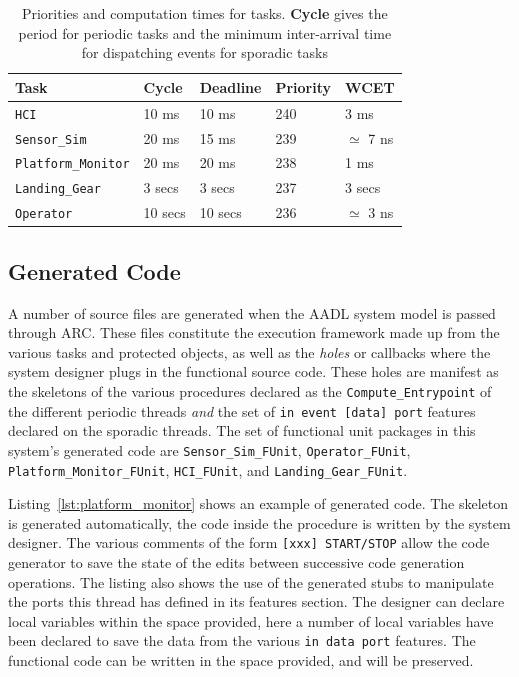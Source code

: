\begin{table}
\centering
\begin{tabular}{|l|l|l|l|l|}
\hline
\textbf{Task} & \textbf{Cycle} & \textbf{Deadline} &
\textbf{Priority} & \textbf{WCET}\\
\hline
\texttt{HCI} & 10 ms & 10 ms & 240 & 3 ms\\
\texttt{Sensor\_Sim} & 20 ms & 15 ms & 239 & $\simeq$ 7 ns\\
\texttt{Platform\_Monitor} & 20 ms & 20 ms & 238 & 1 ms\\
\texttt{Landing\_Gear} & 3 secs & 3 secs & 237 & 3 secs\\
\texttt{Operator} & 10 secs & 10 secs & 236 & $\simeq$ 3 ns\\
\hline
\end{tabular}
\caption{Priorities and computation times for tasks. \textbf{Cycle}
  gives the period for periodic tasks and the minimum inter-arrival
  time for dispatching events for sporadic tasks}
\label{tab:task_set}
\end{table}

\subsection{Generated Code}
\label{sec:case_study_codegen}
A number of source files are generated when the AADL system model is
passed through ARC. These files constitute the execution framework
made up from the various tasks and protected objects, as well as the
\emph{holes} or callbacks where the system designer plugs in the
functional source code. These holes are manifest as the skeletons of
the various procedures declared as the \texttt{Compute\_Entrypoint} of
the different periodic threads \emph{and} the set of \texttt{in event
  [data] port} features declared on the sporadic threads. The set of
functional unit packages in this system's generated code are
\texttt{Sensor\_Sim\_FUnit}, \texttt{Operator\_FUnit},
\texttt{Platform\_Monitor\_FUnit}, \texttt{HCI\_FUnit}, and
\texttt{Landing\_Gear\_FUnit}. 

Listing~\ref{lst:platform_monitor} shows an example of generated
code. The skeleton is generated automatically, the code inside the
procedure is written by the system designer. The various comments of
the form \texttt{[xxx] START/STOP} allow the code generator to save
the state of the edits between successive code generation
operations. The listing also shows the use of the generated stubs to
manipulate the ports this thread has defined in its features
section. The designer can declare local variables within the space
provided, here a number of local variables have been declared to save
the data from the various \texttt{in data port} features. The
functional code can be written in the space provided, and will be
preserved.

